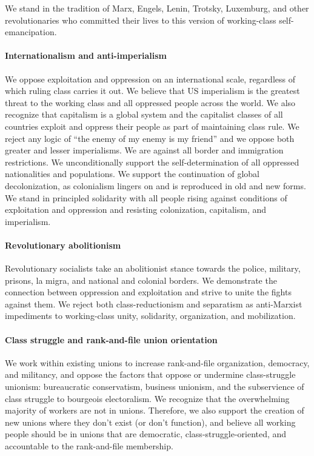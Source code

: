 We stand in the tradition of Marx, Engels, Lenin, Trotsky, Luxemburg, and other revolutionaries who committed their lives to this version of working-class self-emancipation.

\paragraph{Internationalism and anti-imperialism}

We oppose exploitation and oppression on an international scale, regardless of which ruling class carries it out. We believe that US imperialism is the greatest threat to the working class and all oppressed people across the world. We also recognize that capitalism is a global system and the capitalist classes of all countries exploit and oppress their people as part of maintaining class rule. We reject any logic of ``the enemy of my enemy is my friend'' and we oppose both greater and lesser imperialisms. We are against all border and immigration restrictions. We unconditionally support the self-determination of all oppressed nationalities and populations. We support the continuation of global decolonization, as colonialism lingers on and is reproduced in old and new forms. We stand in principled solidarity with all people rising against conditions of exploitation and oppression and resisting colonization, capitalism, and imperialism.

\paragraph{Revolutionary abolitionism}

Revolutionary socialists take an abolitionist stance towards the police, military, prisons, la migra, and national and colonial borders. We demonstrate the connection between oppression and exploitation and strive to unite the fights against them. We reject both class-reductionism and separatism as anti-Marxist impediments to working-class unity, solidarity, organization, and mobilization.

\paragraph{Class struggle and rank-and-file union orientation}

We work within existing unions to increase rank-and-file organization, democracy, and militancy, and oppose the factors that oppose or undermine class-struggle unionism: bureaucratic conservatism, business unionism, and the subservience of class struggle to bourgeois electoralism. We recognize that the overwhelming majority of workers are not in unions. Therefore, we also support the creation of new unions where they don't exist (or don't function), and believe all working people should be in unions that are democratic, class-struggle-oriented, and accountable to the rank-and-file membership.

